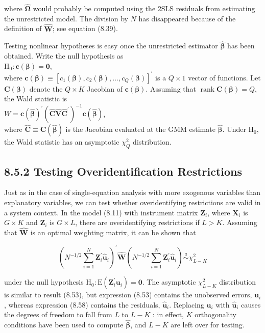 \documentclass[10pt]{article}
\begin{document}
where $\hat{\boldsymbol{\Omega}}$ would probably be computed using the 2SLS residuals from estimating the unrestricted model. The division by $N$ has disappeared because of the definition of $\hat{\mathbf{W}}$; see equation (8.39).

Testing nonlinear hypotheses is easy once the unrestricted estimator $\hat{\boldsymbol{\beta}}$ has been obtained. Write the null hypothesis as\\
$\mathrm{H}_{0}: \mathbf{c}(\boldsymbol{\beta})=\mathbf{0}$,\\
where $\mathbf{c}(\boldsymbol{\beta}) \equiv\left[c_{1}(\boldsymbol{\beta}), c_{2}(\boldsymbol{\beta}), \ldots, c_{Q}(\boldsymbol{\beta})\right]^{\prime}$ is a $Q \times 1$ vector of functions. Let $\mathbf{C}(\boldsymbol{\beta})$ denote the $Q \times K$ Jacobian of $\mathbf{c}(\boldsymbol{\beta})$. Assuming that $\operatorname{rank} \mathbf{C}(\boldsymbol{\beta})=Q$, the Wald statistic is\\
$W=\mathbf{c}(\hat{\boldsymbol{\beta}})^{\prime}\left(\hat{\mathbf{C}} \hat{\mathbf{V}} \hat{\mathbf{C}}^{\prime}\right)^{-1} \mathbf{c}(\hat{\boldsymbol{\beta}})$,\\
where $\hat{\mathbf{C}} \equiv \mathbf{C}(\hat{\boldsymbol{\beta}})$ is the Jacobian evaluated at the GMM estimate $\hat{\boldsymbol{\beta}}$. Under $\mathrm{H}_{0}$, the Wald statistic has an asymptotic $\chi_{Q}^{2}$ distribution.

\subsection*{8.5.2 Testing Overidentification Restrictions}
Just as in the case of single-equation analysis with more exogenous variables than explanatory variables, we can test whether overidentifying restrictions are valid in a system context. In the model (8.11) with instrument matrix $\mathbf{Z}_{i}$, where $\mathbf{X}_{i}$ is $G \times K$ and $\mathbf{Z}_{i}$ is $G \times L$, there are overidentifying restrictions if $L>K$. Assuming that $\hat{\mathbf{W}}$ is an optimal weighting matrix, it can be shown that


\begin{equation*}
\left(N^{-1 / 2} \sum_{i=1}^{N} \mathbf{Z}_{i}^{\prime} \hat{\mathbf{u}}_{i}\right)^{\prime} \hat{\mathbf{W}}\left(N^{-1 / 2} \sum_{i=1}^{N} \mathbf{Z}_{i}^{\prime} \hat{\mathbf{u}}_{i}\right) \stackrel{a}{\sim} \chi_{L-K}^{2} \tag{8.58}
\end{equation*}


under the null hypothesis $\mathrm{H}_{0}: \mathrm{E}\left(\mathbf{Z}_{i}^{\prime} \mathbf{u}_{i}\right)=\mathbf{0}$. The asymptotic $\chi_{L-K}^{2}$ distribution is similar to result (8.53), but expression (8.53) contains the unobserved errors, $\mathbf{u}_{i}$, whereas expression (8.58) contains the residuals, $\hat{\mathbf{u}}_{i}$. Replacing $\mathbf{u}_{i}$ with $\hat{\mathbf{u}}_{i}$ causes the degrees of freedom to fall from $L$ to $L-K$ : in effect, $K$ orthogonality conditions have been used to compute $\hat{\boldsymbol{\beta}}$, and $L-K$ are left over for testing.
\end{document}
